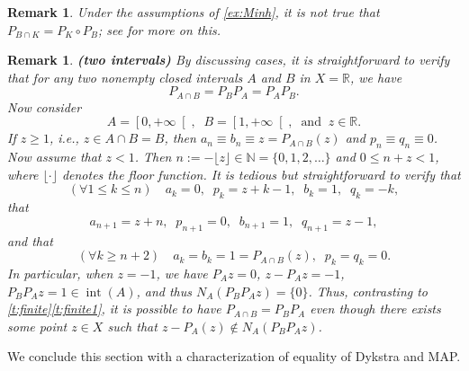 \documentclass[12pt]{article}
\newcommand{\RR}{\ensuremath{\mathbb R}}
\newcommand{\NN}{\ensuremath{\mathbb N}}
\newcommand{\inte}{\ensuremath{\operatorname{int}}}
\newcommand{\pinf}{\ensuremath{+\infty}}
\newtheorem{remark}[theorem]{Remark}
\providecommand{\RR}{\mathbb{R}}
\providecommand{\NN}{\mathbb{N}}
\providecommand{\RR}{\mathbb{R}}
\providecommand{\NN}{\mathbb{N}}
\begin{document}
\begin{remark}
Under the assumptions of \cref{ex:Minh},
it is \emph{not} true that $P_{B\cap K} = P_K \circ P_B$;
see \cite[Example~7.5]{Minh} for more on this.
\end{remark}

\begin{remark}{\rm\bf (two intervals)}
By discussing cases, it is straightforward to verify that 
for any two nonempty closed intervals $A$ and $B$
in $X=\RR$, we have 
\begin{equation}
P_{A\cap B} = P_BP_A = P_AP_B.
\end{equation}
Now consider
\begin{equation}
  A = \left[0,\pinf\right[, 
  \;\;
  B = \left[1,\pinf\right[,\;\;
  \text{and}\;\;
  z \in\RR. 
\end{equation}
If $z\geq 1$, i.e., $z\in A\cap B = B$, then 
$a_n\equiv b_n \equiv z = P_{A\cap B}(z)$
and $p_n\equiv q_n\equiv 0$.
Now assume that $z<1$.
Then $n := -\lfloor z\rfloor \in \NN = \{0,1,2,\ldots\}$ and
$0\leq n+z<1$, where $\lfloor\cdot\rfloor$ denotes the floor function. 
It is tedious but straightforward to verify that 
\begin{equation}
(\forall 1\leq k\leq n)\quad 
a_k = 0,\;\;p_k = z+k-1,\;\; b_k=1,\;\;q_k = -k,
\end{equation}
that 
\begin{equation}
a_{n+1} = z+n,\;\; p_{n+1}=0,\;\; 
b_{n+1} = 1,\;\;q_{n+1} =z-1,
\end{equation}
and that 
\begin{equation}
(\forall k\geq n+2)\quad
a_{k}=b_{k}=1=P_{A\cap B}(z),\;\;
p_{k} = q_{k} = 0.
\end{equation}
In particular, when $z=-1$, we have 
$P_Az = 0$, $z-P_Az=-1$, 
$P_BP_Az = 1\in \inte(A)$, and thus 
$N_A(P_BP_Az) = \{0\}$.
Thus, contrasting to \cref{t:finite}\cref{t:finite1}, 
it is possible to have 
$P_{A\cap B}=P_BP_A$ even though
there exists some point $z\in X$ such that $z-P_A(z)\notin N_A(P_BP_Az)$.
\end{remark}

We conclude this section with a characterization of 
equality of Dykstra and MAP.
\end{document}
